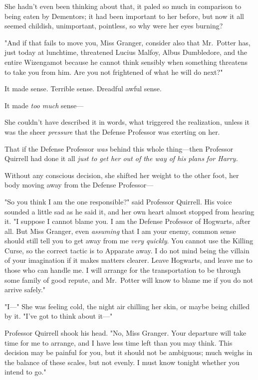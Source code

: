She hadn't even been thinking about that, it paled so much in comparison to 
being eaten by Dementors; it had been important to her before, but now it all 
seemed childish, unimportant, pointless, so why were her eyes burning?

"And if that fails to move you, Miss Granger, consider also that Mr.~Potter 
has, just today at lunchtime, threatened Lucius Malfoy, Albus Dumbledore, and 
the entire Wizengamot because he cannot think sensibly when something threatens 
to take you from him. Are you not frightened of what he will do next?"

It made sense. Terrible sense. Dreadful awful sense.

It made \emph{too much} sense---

She couldn't have described it in words, what triggered the realization, unless 
it was the sheer \emph{pressure} that the Defense Professor was exerting on her.

That if the Defense Professor \emph{was} behind this whole thing---then 
Professor Quirrell had done it all \emph{just to get her out of the way of his 
plans for Harry.}

Without any conscious decision, she shifted her weight to the other foot, her 
body moving away from the Defense Professor---

"So you think I am the one responsible?" said Professor Quirrell. His voice 
sounded a little sad as he said it, and her own heart almost stopped from 
hearing it. "I suppose I cannot blame you. I am the Defense Professor of 
Hogwarts, after all. But Miss Granger, even \emph{assuming} that I am your 
enemy, common sense should still tell you to get away from me \emph{very 
quickly}. You cannot use the Killing Curse, so the correct tactic is to 
Apparate away. I do not mind being the villain of your imagination if it makes 
matters clearer. Leave Hogwarts, and leave me to those who can handle me. I 
will arrange for the transportation to be through some family of good repute, 
and Mr.~Potter will know to blame me if you do not arrive safely."

"I---" She was feeling cold, the night air chilling her skin, or maybe being 
chilled by it. "I've got to think about it---"

Professor Quirrell shook his head. "No, Miss Granger. Your departure will take 
time for me to arrange, and I have less time left than you may think. This 
decision may be painful for you, but it should not be ambiguous; much weighs in 
the balance of these scales, but not evenly. I must know tonight whether you 
intend to go."


